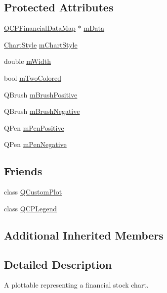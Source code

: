 \subsection*{Protected Attributes}
\begin{DoxyCompactItemize}
\item 
\hyperlink{qcustomplot_8h_a745c09823fae0974b50beca9bc3b3d7d}{Q\+C\+P\+Financial\+Data\+Map} $\ast$ \hyperlink{classQCPFinancial_a475f63587ca1077d8c30aaf2b71ae026}{m\+Data}
\item 
\hyperlink{classQCPFinancial_a0f800e21ee98d646dfc6f8f89d10ebfb}{Chart\+Style} \hyperlink{classQCPFinancial_ab65c2ce8d6354451870bb44b894c1e92}{m\+Chart\+Style}
\item 
double \hyperlink{classQCPFinancial_af630e5eb8485146b9c777e63fd1cf993}{m\+Width}
\item 
bool \hyperlink{classQCPFinancial_a6afe919190b884d9bac026cefcc8c0a8}{m\+Two\+Colored}
\item 
Q\+Brush \hyperlink{classQCPFinancial_ab7e6eed16260a2f88ca6bd940dffea79}{m\+Brush\+Positive}
\item 
Q\+Brush \hyperlink{classQCPFinancial_acb0e31874b7a1deb56bd42e8ab3e68f2}{m\+Brush\+Negative}
\item 
Q\+Pen \hyperlink{classQCPFinancial_aa6599186f417ba615caebb3f6c762bd8}{m\+Pen\+Positive}
\item 
Q\+Pen \hyperlink{classQCPFinancial_a263fbfefde2cc19c8d4024a8319c2bbb}{m\+Pen\+Negative}
\end{DoxyCompactItemize}
\subsection*{Friends}
\begin{DoxyCompactItemize}
\item 
class \hyperlink{classQCPFinancial_a1cdf9df76adcfae45261690aa0ca2198}{Q\+Custom\+Plot}
\item 
class \hyperlink{classQCPFinancial_a8429035e7adfbd7f05805a6530ad5e3b}{Q\+C\+P\+Legend}
\end{DoxyCompactItemize}
\subsection*{Additional Inherited Members}


\subsection{Detailed Description}
A plottable representing a financial stock chart. 



